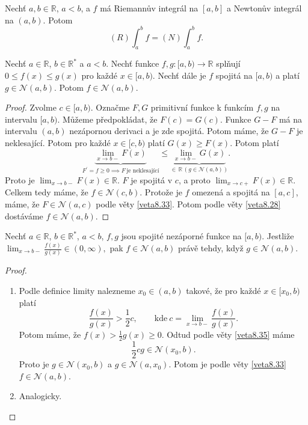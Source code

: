 \begin{veta}\label{veta8.34}
Nechť $a, b \in \mathbb{R}$, $a < b$, a $f$ má Riemannův integrál na $[a, b]$ a Newtonův integrál na $(a, b)$. Potom
\[
(R)\int_a^b f = (N)\int_a^b f.
\]
\end{veta}

\begin{veta}\label{veta8.35}
Nechť $a \in \mathbb{R}$, $b \in \mathbb{R}^\ast$ a $a < b$. Nechť funkce $f, g : [a, b) \to \mathbb{R}$ splňují
$
0 \leq f(x) \leq g(x)
$
pro každé $x \in [a, b)$. Nechť dále je $f$ spojitá na $[a, b)$ a platí $g \in\mathcal N(a, b)$. Potom $f \in\mathcal N(a, b)$.
\end{veta}

\begin{proof}
	Zvolme $c\in [a,b)$. Označme $F,G$ primitivní funkce k funkcím $f,g$ na intervalu $[a,b)$.
	Můžeme předpokládat, že $F(c)=G(c)$. Funkce $G-F$ má na intervalu $(a,b)$ nezápornou derivaci
	a je zde spojitá. Potom máme, že $G-F$ je neklesající. Potom pro každé $x \in [c,b)$ platí
	$G(x)\geq F(x)$. Potom platí
	$$
 \underbrace{\lim_{x \to b-} F(x)}_{F^\prime = f \geq 0\implies F \ \text{je neklesající}} \leq \underbrace{\lim_{x \to b-} G(x)}_{\in \, \mathbb R \, (g \in \mathcal N(a,b))}.
	$$
	Proto je
	$
 \lim_{x\to b-} F(x) \in \mathbb R
	$.
	$F$ je spojitá v $c$, a proto $\lim_{x\to c+} F(x)\in \mathbb R $. Celkem tedy máme, že
	$f \in \mathcal N(c,b)$. Protože je $f$ omezená a spojitá na $[a,c]$, máme, že
	$F\in \mathcal N(a,c)$ podle věty \ref{veta8.33}. Potom podle věty \ref{veta8.28} dostáváme $f \in \mathcal N(a,b)$.
\end{proof}

\begin{veta}\label{veta8.36}
Nechť $a \in \mathbb{R}$, $b \in \mathbb{R}^\ast$, $a < b$, $f, g$ jsou spojité nezáporné funkce na $[a, b)$. Jestliže
$
\lim_{x \to b-} \frac{f(x)}{g(x)} \in (0,\infty),
$
pak $f \in \mathcal N(a, b)$ právě tehdy, když $g \in\mathcal N(a, b)$.
\end{veta}

\begin{proof}\,
\begin{enumerate}
	\item[$\implies$] Podle definice limity nalezneme $x_0\in (a,b)$ takové, že pro každé $x \in [x_0,b)$
	platí
	$$
 \frac{f(x)}{g(x)}>\frac{1}{2}c, \qquad \text{kde} \ c= \lim_{x\to b-} \frac{f(x)}{g(x)}.
	$$
	Potom máme, že $f(x) > \frac{1}{2}g(x)\geq 0$. Odtud podle věty \ref{veta8.35} máme
	$$
 \frac{1}{2}cg \in \mathcal N(x_0,b).
	$$
	Proto je $g\in \mathcal N(x_0,b)$ a $g \in \mathcal N(a,x_0)$. Potom je podle věty \ref{veta8.33}
	$f \in \mathcal N(a,b)$.
	\item[$\impliedby$] Analogicky.\qedhere
\end{enumerate}
\end{proof}


